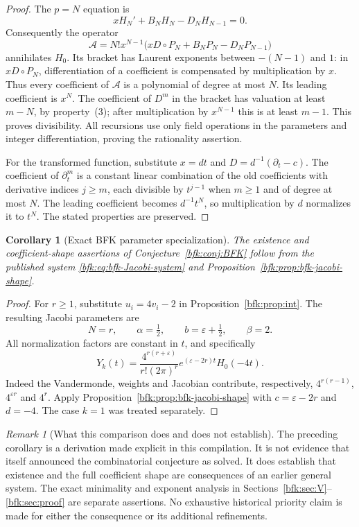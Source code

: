 \documentclass[11pt,a4paper]{article}
\newtheorem{corollary}[theorem]{Corollary}
\theoremstyle{definition}
\theoremstyle{remark}
\newtheorem{remark}[theorem]{Remark}
\numberwithin{equation}{section}
\begin{document}
\begin{proof}
The $p=N$ equation is
\[
 xH_N'+B_NH_N-D_NH_{N-1}=0.
\]
Consequently the operator
\begin{equation}\label{bfk:eq:bfk-A-construction}
 \mathcal A=N!x^{N-1}\bigl(xD\circ P_N+B_NP_N-D_NP_{N-1}\bigr)
\end{equation}
annihilates $H_0$. Its bracket has Laurent exponents between $-(N-1)$
and $1$: in $xD\circ P_N$, differentiation of a coefficient is compensated
by multiplication by $x$. Thus every coefficient of $\mathcal A$ is a
polynomial of degree at most $N$. Its leading coefficient is $x^N$.
The coefficient of $D^m$ in the bracket has valuation at least $m-N$,
by property~(3); after multiplication by $x^{N-1}$ this is at least $m-1$.
This proves divisibility. All recursions use only field operations in the
parameters and integer differentiation, proving the rationality assertion.

For the transformed function, substitute $x=dt$ and
$D=d^{-1}(\partial_t-c)$. The coefficient of $\partial_t^m$ is a constant
linear combination of the old coefficients with derivative indices $j\ge m$,
each divisible by $t^{j-1}$ when $m\ge1$ and of degree at most $N$.
The leading coefficient becomes $d^{-1}t^N$, so multiplication by $d$
normalizes it to $t^N$. The stated properties are preserved.
\end{proof}

\begin{corollary}[Exact BFK parameter specialization]\label{bfk:cor:bfk-FK-specialization}
The existence and coefficient-shape assertions of
Conjecture~\ref{bfk:conj:BFK} follow from the published system
\eqref{bfk:eq:bfk-Jacobi-system} and Proposition~\ref{bfk:prop:bfk-jacobi-shape}.
\end{corollary}
\begin{proof}
For $r\ge1$, substitute $u_i=4v_i-2$ in
Proposition~\ref{bfk:prop:int}. The resulting Jacobi parameters are
\[
 N=r,\qquad \alpha=\tfrac12,\qquad b=\varepsilon+\tfrac12,
 \qquad \beta=2.
\]
All normalization factors are constant in $t$, and specifically
\[
 Y_k(t)=\frac{4^{r(r+\varepsilon)}}{r!(2\pi)^r}
        e^{(\varepsilon-2r)t}H_0(-4t).
\]
Indeed the Vandermonde, weights and Jacobian contribute, respectively,
$4^{r(r-1)}$, $4^{\varepsilon r}$ and $4^r$.
Apply Proposition~\ref{bfk:prop:bfk-jacobi-shape} with $c=\varepsilon-2r$ and
$d=-4$. The case $k=1$ was treated separately.
\end{proof}

\begin{remark}[What this comparison does and does not establish]
The preceding corollary is a derivation made explicit in this compilation.
It is not evidence that \cite{FK22} itself announced the combinatorial
conjecture as solved. It does establish that existence and the full
coefficient shape are consequences of an earlier general system. The exact
minimality and exponent analysis in Sections~\ref{bfk:sec:V}--\ref{bfk:sec:proof}
are separate assertions. No exhaustive historical priority claim is made
for either the consequence or its additional refinements.
\end{remark}
\end{document}
